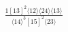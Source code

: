 \documentclass[varwidth, border=5pt]{standalone}
\begin{document}
\begin{my}
$\begin{gathered}
\scriptscriptstyle\frac{1[13]^2⟨12⟩⟨24⟩⟨13⟩}{⟨14⟩^3[15]^2⟨23⟩}
\end{gathered}$
\end{my}
\end{document}
